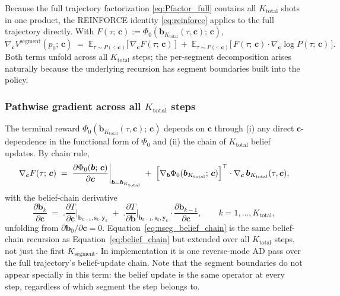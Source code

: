 \documentclass[11pt,a4paper]{article}
\newcommand{\bc}{\bm{c}}
\newcommand{\by}{\bm{y}}
\newcommand{\bs}{\bm{s}}
\newcommand{\bb}{\bm{b}}
\newcommand{\E}{\mathbb{E}}
\begin{document}
Because the full trajectory factorization \eqref{eq:Pfactor_full} contains all $K_\mathrm{total}$
shots in one product, the REINFORCE identity \eqref{eq:reinforce} applies to the full
trajectory directly.  With $F(\tau;\, \bc) := \Phi_0(\bb_{K_\mathrm{total}}(\tau, \bc);\, \bc)$,
\begin{equation}
\nabla_{\bc} V^\mathrm{segment}(p_0;\, \bc)
\;=\;
\E_{\tau \sim P(\cdot;\, \bc)}\!\bigl[\,\nabla_{\bc} F(\tau;\, \bc)\,\bigr]
\;+\;
\E_{\tau \sim P(\cdot;\, \bc)}\!\bigl[\,F(\tau;\, \bc) \cdot \nabla_{\bc} \log P(\tau;\, \bc)\,\bigr].
\label{eq:nseg_reinforce}
\end{equation}
Both terms unfold across all $K_\mathrm{total}$ steps; the per-segment decomposition arises
naturally because the underlying recursion has segment boundaries built into the policy.

\subsubsection{Pathwise gradient across all \texorpdfstring{$K_\mathrm{total}$}{K\_total} steps}
\label{sec:nseg_pathwise}

The terminal reward $\Phi_0(\bb_{K_\mathrm{total}}(\tau, \bc);\, \bc)$ depends on $\bc$
through (i) any direct $\bc$-dependence in the functional form of $\Phi_0$ and (ii) the
chain of $K_\mathrm{total}$ belief updates.  By chain rule,
\begin{equation}
\nabla_{\bc} F(\tau;\, \bc)
\;=\;
\biggl.\frac{\partial \Phi_0(\bb;\, \bc)}{\partial \bc}\biggr|_{\bb = \bb_{K_\mathrm{total}}}
\;+\;
\Bigl[\nabla_{\bb} \Phi_0(\bb_{K_\mathrm{total}};\, \bc)\Bigr]^\top \cdot \nabla_{\bc}\, \bb_{K_\mathrm{total}}(\tau, \bc),
\label{eq:nseg_pathwise}
\end{equation}
with the belief-chain derivative
\begin{equation}
\frac{\partial \bb_k}{\partial \bc}
\;=\;
\biggl.\frac{\partial T}{\partial \bc}\biggr|_{\bb_{k-1}, \bs_k, \by_k}
\;+\;
\biggl.\frac{\partial T}{\partial \bb}\biggr|_{\bb_{k-1}, \bs_k, \by_k}
\cdot
\frac{\partial \bb_{k-1}}{\partial \bc},
\qquad k = 1, \ldots, K_\mathrm{total},
\label{eq:nseg_belief_chain}
\end{equation}
unfolding from $\partial \bb_0 / \partial \bc = 0$.  Equation~\eqref{eq:nseg_belief_chain}
is the same belief-chain recursion as Equation~\eqref{eq:belief_chain} but extended over all
$K_\mathrm{total}$ steps, not just the first $K_\mathrm{segment}$.  In implementation it is
one reverse-mode AD pass over the full trajectory's belief-update chain.  Note that
the segment boundaries do not appear specially in this term: the belief update is the same
operator at every step, regardless of which segment the step belongs to.
\end{document}

